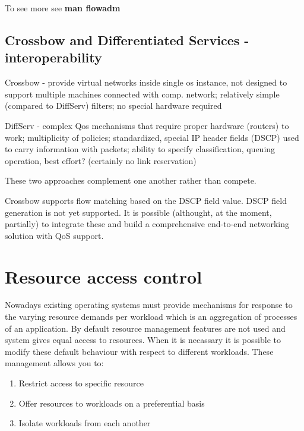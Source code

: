 \documentclass[11pt]{book}
\begin{document}
        To see more see \textbf{man flowadm}


      \subsection{Crossbow and Differentiated Services - interoperability}
      \label{sub:sol:diffserv}

        Crossbow - provide virtual networks inside single os instance, not designed to support multiple machines
        connected with comp. network; relatively simple (compared to DiffServ) filters; no special hardware required

        DiffServ - complex Qos mechanisms that require proper hardware (routers) to work; multiplicity of policies;
        standardized, special IP header fields (DSCP) used to carry information with packets; ability to specify
        classification, queuing operation, best effort? (certainly no link reservation)

        These two approaches complement one another rather than compete.

        Crossbow supports flow matching based on the DSCP field value. DSCP field generation is not yet supported. It is
        possible (althought, at the moment, partially) to integrate these and build a comprehensive end-to-end
        networking solution with QoS support.


    \section{Resource access control}

      Nowadays existing operating systems must provide mechanisms for response to the varying resource demands
      per workload which is an aggregation of processes of an application. By default resource management
      features are not used and system gives equal access to resources. When it is necassary it is possible to
      modify these default behaviour with respect to different workloads. These management allows you to:

      \begin{enumerate}
        \item{Restrict access to specific resource}
        \item{Offer resources to workloads on a preferential basis}
        \item{Isolate workloads from each another}
      \end{enumerate}
	
\end{document}
